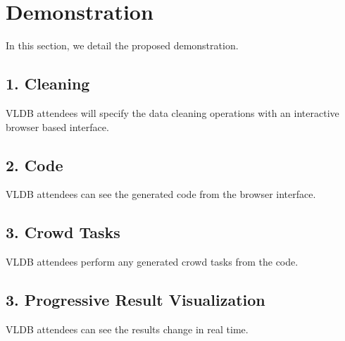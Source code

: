 \section{Demonstration}
In this section, we detail the proposed demonstration.

\subsection{1. Cleaning}
VLDB attendees will specify the data cleaning operations with an interactive browser based
interface. 

\subsection{2. Code}
VLDB attendees can see the generated code from the browser interface.

\subsection{3. Crowd Tasks}
VLDB attendees perform any generated crowd tasks from the code.  

\subsection{3. Progressive Result Visualization}
VLDB attendees can see the results change in real time.  
